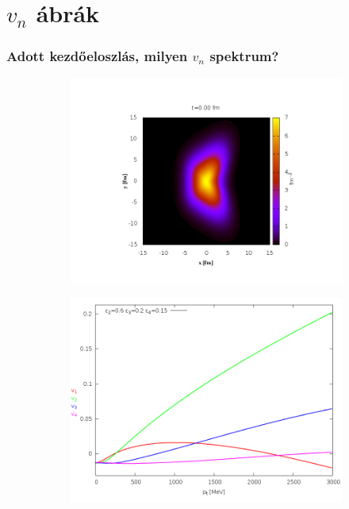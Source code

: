 \documentclass{beamer}
\begin{document}
\section{$v_n$ ábrák}
\begin{frame}
\frametitle{Adott kezdőeloszlás, milyen $v_n$ spektrum?}
\begin{center}
\begin{figure}[H]
	\centering
    \begin{subfigure}[b]{0.49\textwidth}
    		\includegraphics[width=\textwidth]{pic/ini}
	\end{subfigure}
	\begin{subfigure}[b]{0.49\textwidth}
        	\includegraphics[width=\textwidth]{pic/ini_vn}
	\end{subfigure}
\end{figure}
\end{center}
\end{frame}
\end{document}
